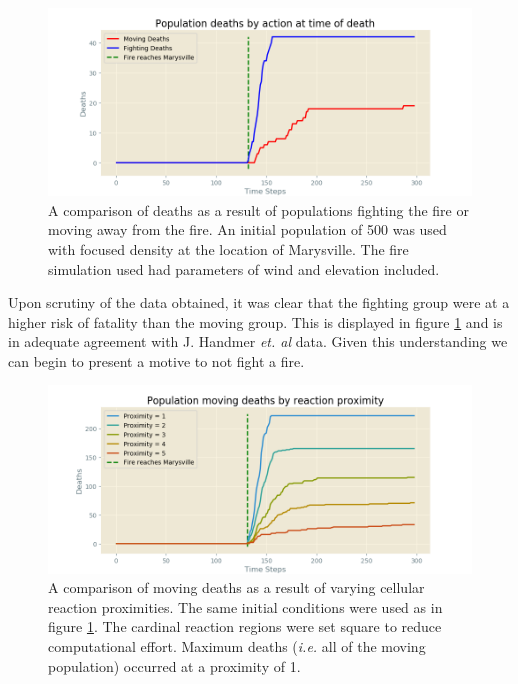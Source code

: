 \begin{figure}[h!]
    \centering
    \includegraphics[width=1.0\textwidth]{Figures/fight_vs_flight_deaths.png}
    \caption{A comparison of deaths as a result of populations fighting the fire or moving away from the fire. An initial population of 500 was used with focused density at the location of Marysville. The fire simulation used had parameters of wind and elevation included.}
    \label{forf}
\end{figure}
Upon scrutiny of the data obtained, it was clear that the fighting group were at a higher risk of fatality than the moving group. This is displayed in figure \ref{forf} and is in adequate agreement with J. Handmer \textit{et. al} data. Given this understanding we can begin to present a motive to not fight a fire.
\begin{figure}[h!]
    \centering
    \includegraphics[width=\textwidth]{Figures/proximity_deaths.png}
    \caption{A comparison of moving deaths as a result of varying cellular reaction proximities. The same initial conditions were used as in figure \ref{forf}. The cardinal reaction regions were set square to reduce computational effort. Maximum deaths (\textit{i.e.} all of the moving population) occurred at a proximity of 1.}
    \label{proximity_deaths}
\end{figure}
